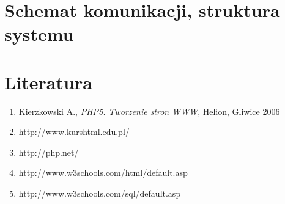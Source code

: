 \documentclass[a4paper, 11pt]{article}
\begin{document}
\section{Schemat komunikacji, struktura systemu}
\section{Literatura}
\begin{enumerate}
	\item Kierzkowski A., \textit{PHP5. Tworzenie stron WWW}, Helion, Gliwice 2006
	\item http://www.kurshtml.edu.pl/
	\item http://php.net/
	\item http://www.w3schools.com/html/default.asp
	\item http://www.w3schools.com/sql/default.asp
\end{enumerate}
\end{document}
